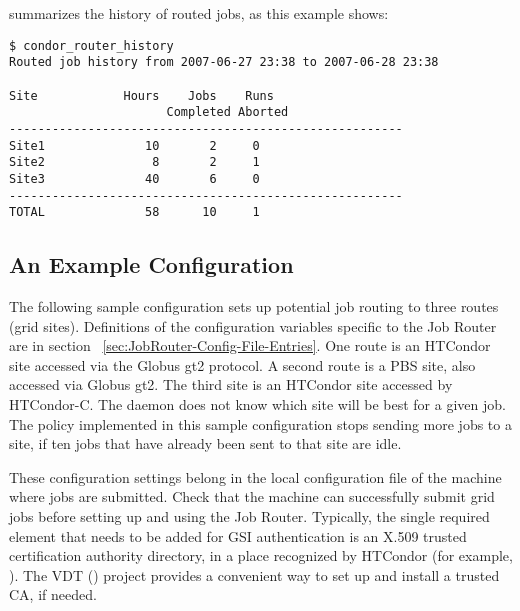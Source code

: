  summarizes the history of routed jobs,
as this example shows:

\begin{verbatim}
$ condor_router_history
Routed job history from 2007-06-27 23:38 to 2007-06-28 23:38

Site            Hours    Jobs    Runs
                      Completed Aborted
-------------------------------------------------------
Site1              10       2     0
Site2               8       2     1
Site3              40       6     0
-------------------------------------------------------
TOTAL              58      10     1
\end{verbatim}


\subsection{\label{ExampleJobRouterConfiguration} An Example Configuration}

The following sample configuration sets up potential job routing
to three routes (grid sites).
Definitions of the configuration variables specific to the Job Router
are in section~ \ref{sec:JobRouter-Config-File-Entries}.
One route is an HTCondor site accessed via the Globus gt2 protocol.
A second route is a PBS site, also accessed via Globus gt2.
The third site is an HTCondor site accessed by HTCondor-C.
The  daemon
does not know which site will be best for a given job.
The policy implemented in this sample configuration 
stops sending more jobs to a site,
if ten jobs that have already been sent to that site are idle.

These configuration settings belong in the local configuration file
of the machine where jobs are submitted.
Check that the machine can successfully submit grid jobs
before setting up and using the Job Router.
Typically, the single required element that needs to be
added for GSI authentication
is an X.509 trusted certification authority directory,
in a place recognized by HTCondor
(for example,  ).
The VDT () project provides 
a convenient way to set up and install a trusted CA,
if needed.

